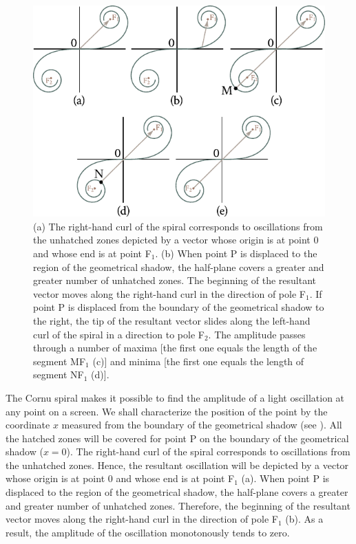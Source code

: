 \begin{figure}[t]
	\begin{center}
		\includegraphics[scale=1]{figures/ch_18/fig_18_20.pdf}
        \caption[]{(a) The right-hand curl of the spiral corresponds to oscillations from the unhatched zones depicted by a vector whose origin is at point 0 and whose end is at point F$_1$. (b) When point P is displaced to the region of the geometrical shadow, the half-plane covers a greater and greater number of unhatched zones. The beginning of the resultant vector moves along the right-hand curl in the direction of pole F$_1$. If point P is displaced from the boundary of the geometrical shadow to the right, the tip of the resultant vector slides along the left-hand curl of the spiral in a direction to pole F$_2$. The amplitude passes through a number of maxima [the first one equals the length of the segment MF$_1$ (c)] and minima [the first one equals the length of segment NF$_1$ (d)]. }
		\label{fig:18_20}
	\end{center}
	\vspace{-0.8cm}
\end{figure}

The Cornu spiral makes it possible to find the amplitude of a light oscillation at any point on a screen.
We shall characterize the position of the point by the coordinate $x$ measured from the boundary of the geometrical shadow (see ).
All the hatched zones will be covered for point P on the boundary of the geometrical shadow ($x=0$).
The right-hand curl of the spiral corresponds to oscillations from the unhatched zones.
Hence, the resultant oscillation will be depicted by a vector whose origin is at point $0$ and whose end is at point F$_1$ (a).
When point P is displaced to the region of the geometrical shadow, the half-plane covers a greater and greater number of unhatched zones.
Therefore, the beginning of the resultant vector moves along the right-hand curl in the direction of pole F$_1$ (b).
As a result, the amplitude of the oscillation monotonously tends to zero.


